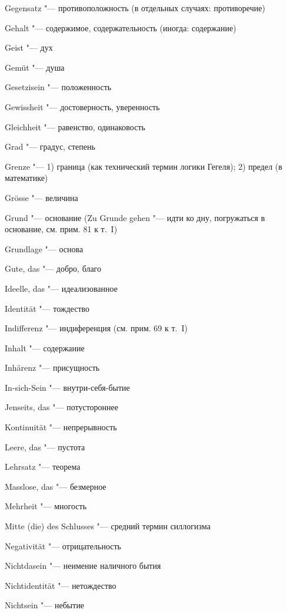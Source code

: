 {{\begin{multicols}{2}
Gegensatz "--- противоположность (в отдельных случаях:
противоречие)

Gehalt "--- содержимое, содержательность (иногда: содержание)

Geist "--- дух

Gemüt "--- душа

Gesetzisein "--- положенность

Gewissheit "--- достоверность, уверенность

Gleichheit "--- равенство, одинаковость

Grad "--- градус, степень

Grenze "--- 1) граница (как технический термин логики Гегеля); 2) предел
(в математике)

Grösse "--- величина

Grund "--- основание (Zu Grunde gehen "--- идти ко дну, погружаться в основание,
см. прим. 81 к т.~I)

Grundlage "--- основа

Gute, das "--- добро, благо

\bigskip

Ideelle, das "--- идеализованное

Identität "--- тождество

Indifferenz "--- индиференция (см. прим. 69 к т.~I)

Inhalt "--- содержание

Inhärenz "--- присущность

In-sich-Sein "--- внутри-себя-бытие

\bigskip

Jenseits, das "--- потустороннее

\bigskip

Kontinuität "--- непрерывность

\bigskip

Leere, das "--- пустота

Lehrsatz "--- теорема

\bigskip

Masslose, das "--- безмерное

Mehrheit "--- многость

Mitte (die) des Schlusses "--- средний термин силлогизма

\bigskip

Negativität "--- отрицательность

Nichtdasein "--- неимение наличного бытия

Nichtidentität "--- нетождество

Nichtsein "--- небытие


\end{multicols}}}
